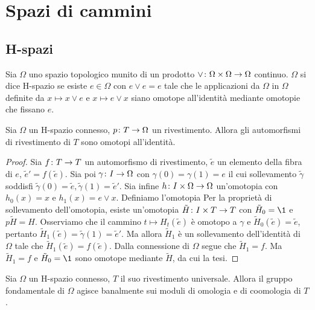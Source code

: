 \chapter{Spazi di cammini}
\section{H-spazi}
\begin{definition}
Sia $\Omega$ uno spazio topologico munito di un prodotto $\vee\colon\Omega\times \Omega\to\Omega$ continuo. $\Omega$ si dice H-spazio se esiste $e\in \Omega$ con $e\vee e=e$ tale che le applicazioni da $\Omega$ in $\Omega$ definite da $x\mapsto x\vee e$ e $x\mapsto e\vee x$ siano omotope all'identità mediante omotopie che fissano $e$.
\end{definition}
\begin{proposition}
Sia $\Omega$ un H-spazio connesso, $p\colon T\to\Omega$ un rivestimento. Allora gli automorfismi di rivestimento di $T$ sono omotopi all'identità.
\end{proposition}
\begin{proof}
Sia $f\colon T\to T$ un automorfismo di rivestimento, $\tilde{e}$ un elemento della fibra di $e$, $\tilde{e}'=f(\tilde{e})$. Sia poi $\gamma\colon I\to\Omega$ con $\gamma(0)=\gamma(1)=e$ il cui sollevamento $\tilde\gamma$ soddisfi $\tilde\gamma(0)=\tilde{e},\tilde\gamma(1)=\tilde{e}'$. Sia infine $h\colon I\times \Omega\to\Omega$ un'omotopia con $h_0(x)=x$ e $h_1(x)=e\vee x$. Definiamo l'omotopia
Per la proprietà di sollevamento dell'omotopia, esiste un'omotopia $\tilde{H}\colon I\times T\to T$ con $\tilde{H}_0=\1$ e $p\tilde{H}=H$. Osserviamo che il cammino $t\mapsto H_t(\tilde{e})$ è omotopo a $\gamma$ e $\tilde{H}_0(\tilde{e})=\tilde{e}$, pertanto $\tilde{H}_1(\tilde{e})=\tilde{\gamma}(1)=\tilde{e}'$. Ma allora $\tilde{H}_1$ è un sollevamento dell'identità di $\Omega$ tale che $\tilde{H}_1(\tilde{e})=f(\tilde{e})$. Dalla connessione di $\Omega$ segue che $\tilde{H}_1=f$. Ma $\tilde{H}_1=f$ e $\tilde{H}_0=\1$ sono omotope mediante $\tilde H$, da cui la tesi.
\end{proof}
\begin{corollary}
Sia $\Omega$ un H-spazio connesso, $T$ il suo rivestimento universale. Allora il gruppo fondamentale di $\Omega$ agisce banalmente sui moduli di omologia e di coomologia di $T$.
\end{corollary}

